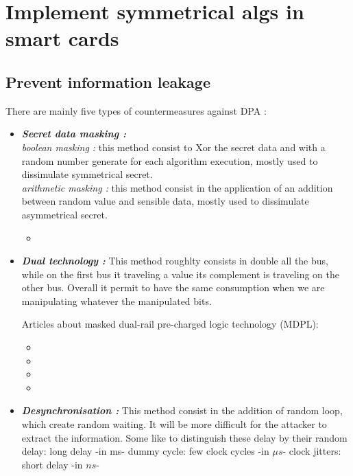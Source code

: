 \section{Implement symmetrical algs in smart cards}

\subsection{Prevent information leakage}
\label{Prevent_information_leakage}

There are mainly five types of countermeasures against DPA :
\begin{itemize}
\item \textbf{\textit{Secret data masking :}}\\
\textit{boolean masking :} this method consist to Xor the secret data and with a
random number generate for each algorithm execution, mostly used to dissimulate symmetrical secret.\\
\textit{arithmetic masking :} this method consist in the application of an addition 
between random value and sensible data, mostly used to dissimulate asymmetrical secret.

\begin{itemize}
	\item[] 
\end{itemize}

\item \textbf{\textit{Dual technology :}} 
This method roughlty consists in double all the bus, while on the first bus it traveling 
a value its complement is traveling on the other bus. Overall it permit to have 
the same consumption when we are manipulating whatever the manipulated bits.

Articles about masked dual-rail pre-charged logic technology (MDPL):
\begin{itemize}
	\item[] 
	\item[] 
	\item[] 
	\item[] 
\end{itemize}


\item \textbf{\textit{Desynchronisation :}} 
This method consist in the addition of random loop, which create random waiting.
It will be more difficult for the attacker to extract the information. 
Some like to distinguish these delay by their 
random delay: long delay -in ms-
dummy cycle: few clock cycles -in  $\mu s$-
clock jitters: short delay -in $n s$-


\end{itemize}
